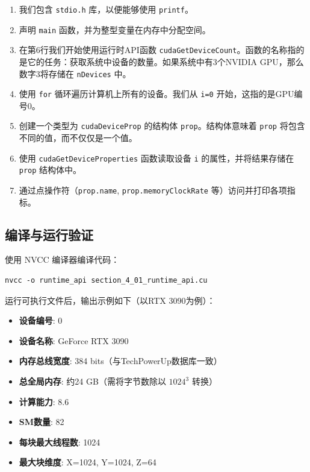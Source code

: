 \begin{enumerate}
    \item 我们包含 \texttt{stdio.h} 库，以便能够使用 \texttt{printf}。
    \item 声明 \texttt{main} 函数，并为整型变量在内存中分配空间。
    \item 在第6行我们开始使用运行时API函数 \texttt{cudaGetDeviceCount}。函数的名称指的是它的任务：获取系统中设备的数量。如果系统中有3个NVIDIA GPU，那么数字3将存储在 \texttt{nDevices} 中。
    \item 使用 \texttt{for} 循环遍历计算机上所有的设备。我们从 \texttt{i=0} 开始，这指的是GPU编号0。
    \item 创建一个类型为 \texttt{cudaDeviceProp} 的结构体 \texttt{prop}。结构体意味着 \texttt{prop} 将包含不同的值，而不仅仅是一个值。
    \item 使用 \texttt{cudaGetDeviceProperties} 函数读取设备 \texttt{i} 的属性，并将结果存储在 \texttt{prop} 结构体中。
    \item 通过点操作符（\texttt{prop.name}, \texttt{prop.memoryClockRate} 等）访问并打印各项指标。
\end{enumerate}

\subsection{编译与运行验证}

使用 NVCC 编译器编译代码：

\begin{verbatim}
nvcc -o runtime_api section_4_01_runtime_api.cu
\end{verbatim}

运行可执行文件后，输出示例如下（以RTX 3090为例）：
\begin{itemize}
    \item \textbf{设备编号}: 0
    \item \textbf{设备名称}: GeForce RTX 3090
    \item \textbf{内存总线宽度}: 384 bits（与TechPowerUp数据库一致）
    \item \textbf{总全局内存}: 约24 GB（需将字节数除以 $1024^3$ 转换）
    \item \textbf{计算能力}: 8.6
    \item \textbf{SM数量}: 82
    \item \textbf{每块最大线程数}: 1024
    \item \textbf{最大块维度}: X=1024, Y=1024, Z=64
\end{itemize}

